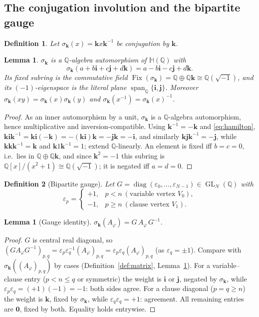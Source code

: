 \documentclass[pdflatex,sn-mathphys-num]{sn-jnl}
\theoremstyle{thmstyleone}%
\newtheorem{lemma}[theorem]{Lemma}%
\theoremstyle{thmstyletwo}%
\theoremstyle{thmstylethree}%
\newtheorem{definition}{Definition}%
\newcommand{\HH}{\mathbb{H}}
\newcommand{\QQ}{\mathbb{Q}}
\newcommand{\Fix}{\operatorname{Fix}}
\newcommand{\bi}{\mathbf{i}}
\newcommand{\bj}{\mathbf{j}}
\newcommand{\bk}{\mathbf{k}}
\newcommand{\Aphi}{A_{\varphi}}
\DeclareMathOperator{\spann}{span}
\DeclareMathOperator{\diag}{diag}
\DeclareMathOperator{\GL}{GL}
\begin{document}
\subsection{The conjugation involution and the bipartite gauge}

\begin{definition}\label{def:sigma}
Let $\sigma_{\bk}(x)=\bk x\bk^{-1}$ be conjugation by $\bk$.
\end{definition}

\begin{lemma}\label{lem:sigma}
$\sigma_{\bk}$ is a $\QQ$-algebra automorphism of $\HH(\QQ)$ with
\[
  \sigma_{\bk}(a+b\bi+c\bj+d\bk)=a-b\bi-c\bj+d\bk .
\]
Its fixed subring is the commutative field
$\Fix(\sigma_{\bk})=\QQ\oplus\QQ\bk\cong\QQ(\sqrt{-1})$, and its
$(-1)$-eigenspace is the literal plane $\spann_\QQ\{\bi,\bj\}$. Moreover
$\sigma_{\bk}(xy)=\sigma_{\bk}(x)\sigma_{\bk}(y)$ and
$\sigma_{\bk}(x^{-1})=\sigma_{\bk}(x)^{-1}$.
\end{lemma}

\begin{proof}
As an inner automorphism by a unit, $\sigma_{\bk}$ is a $\QQ$-algebra
automorphism, hence multiplicative and inversion-compatible. Using
$\bk^{-1}=-\bk$ and \eqref{eq:hamilton},
$\bk\bi\bk^{-1}=\bk\bi(-\bk)=-(\bk\bi)\bk=-\bj\bk=-\bi$, and similarly
$\bk\bj\bk^{-1}=-\bj$, while $\bk\bk\bk^{-1}=\bk$ and $\bk1\bk^{-1}=1$;
extend $\QQ$-linearly. An element is fixed iff $b=c=0$, i.e.\ lies in
$\QQ\oplus\QQ\bk$, and since $\bk^2=-1$ this subring is
$\QQ[x]/(x^2+1)\cong\QQ(\sqrt{-1})$; it is negated iff $a=d=0$.
\end{proof}

\begin{definition}[Bipartite gauge]\label{def:gauge}
Let $G=\diag(\varepsilon_0,\dots,\varepsilon_{N-1})\in\GL_N(\QQ)$ with
\[
  \varepsilon_p=\begin{cases}+1,&p<n\ (\text{variable vertex }V_0),\\
  -1,&p\ge n\ (\text{clause vertex }V_1).\end{cases}
\]
\end{definition}

\begin{lemma}[Gauge identity]\label{lem:gauge}
$\sigma_{\bk}(\Aphi)=G\,\Aphi\,G^{-1}$.
\end{lemma}

\begin{proof}
$G$ is central real diagonal, so
$(G\Aphi G^{-1})_{p,q}=\varepsilon_p\varepsilon_q^{-1}(\Aphi)_{p,q}
=\varepsilon_p\varepsilon_q(\Aphi)_{p,q}$ (as $\varepsilon_q=\pm1$). Compare
with $\sigma_{\bk}((\Aphi)_{p,q})$ by cases (Definition~\ref{def:matrix},
Lemma~\ref{lem:sigma}). For a variable--clause entry ($p<n\le q$ or
symmetric) the weight is $\bi$ or $\bj$, negated by $\sigma_{\bk}$, while
$\varepsilon_p\varepsilon_q=(+1)(-1)=-1$: both sides agree. For a clause
diagonal ($p=q\ge n$) the weight is $\bk$, fixed by $\sigma_{\bk}$, while
$\varepsilon_q\varepsilon_q=+1$: agreement. All remaining entries are
$\mathbf0$, fixed by both. Equality holds entrywise.
\end{proof}
\end{document}
